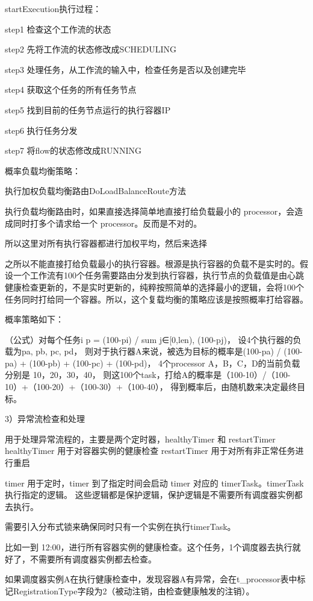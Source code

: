 startExecution执行过程：

step1 检查这个工作流的状态

step2 先将工作流的状态修改成SCHEDULING

step3 处理任务，从工作流的输入中，检查任务是否以及创建完毕

step4 获取这个任务的所有任务节点

step5 找到目前的任务节点运行的执行容器IP

step6 执行任务分发

step7 将flow的状态修改成RUNNING

概率负载均衡策略：

执行加权负载均衡路由DoLoadBalanceRoute方法

执行负载均衡路由时，如果直接选择简单地直接打给负载最小的 processor，会造成同时打多个请求给一个 processor。反而是不对的。

所以这里对所有执行容器都进行加权平均，然后来选择

之所以不能直接打给负载最小的执行容器。根源是执行容器的负载不是实时的。假设一个工作流有100个任务需要路由分发到执行容器，执行节点的负载值是由心跳
健康检查更新的，不是实时更新的，纯粹按照简单的选择最小的逻辑，会将100个任务同时打给同一个容器。所以，这个复载均衡的策略应该是按照概率打给容器。

概率策略如下：

（公式）对每个任务i p = (100-pi) / sum j∈[0,len), (100-pj)，
设4个执行器的负载为pa, pb, pc, pd，
则对于执行器A来说，被选为目标的概率是(100-pa) / (100-pa) + (100-pb) + (100-pc) + (100-pd)，
4个processor A，B，C，D的当前负载分别是 10，20，30，40，
则这100个task，打给A的概率是（100-10）/（100-10）+（100-20）+（100-30）+（100-40），
得到概率后，由随机数来决定最终目标。

3）异常流检查和处理

用于处理异常流程的，主要是两个定时器，healthyTimer 和 restartTimer
healthyTimer 用于对容器实例的健康检查
restartTimer 用于对所有非正常任务进行重启

timer 用于定时，timer 到了指定时间会启动 timer 对应的 timerTask。timerTask 执行指定的逻辑。
这些逻辑都是保护逻辑，保护逻辑是不需要所有调度器实例都去执行\cite{jyfw}。

需要引入分布式锁来确保同时只有一个实例在执行timerTask。

比如一到 12:00，进行所有容器实例的健康检查。这个任务，1个调度器去执行就好了，不需要所有调度器实例都去检查。

如果调度器实例A在执行健康检查中，发现容器A有异常，会在t\_processor表中标记RegistrationType字段为2（被动注销，由检查健康触发的注销）。

